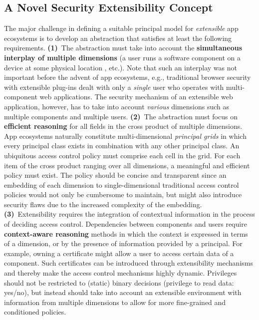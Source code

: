 \documentclass{src/acm_proc_article-sp} \else
\begin{document}
\subsection{A Novel Security Extensibility Concept}


The major challenge in defining a suitable principal model
for \emph{extensible} app ecosystems is to develop an
abstraction that satisfies at least the following
requirements.
\textbf{(1)}~The abstraction must take into account the
\textbf{simultaneous interplay of multiple dimensions} (a
user  runs a software component  on a device  at
some physical location , etc.). Note that such an interplay was not
important before the advent of app ecosystems, e.g.,
traditional browser security with extensible plug-ins dealt
with only a \emph{single} user who operates with multi-component
web applications. The security mechanism of an extensible
web application, however, has to take into account \emph{various}
dimensions such as multiple components and multiple users.
\textbf{(2)}~The abstraction must focus on \textbf{efficient
reasoning} for all fields in the cross product of multiple
dimensions. App ecosystems naturally constitute
multi-dimensional \emph{principal grids} in which every principal
class exists in combination with any other principal class.
An ubiquitous access control policy must comprise each cell
in the grid. For each item of the cross product ranging over
all dimensions, a meaningful and efficient policy must
exist. The policy should be concise and transparent since an
embedding of each dimension to single-dimensional
traditional access control policies would not only be
cumbersome to maintain, but might also introduce security
flaws due to the increased complexity of the embedding.
\textbf{(3)}~Extensibility requires the integration of
contextual information in the process of deciding access
control. Dependencies between components and users require
\textbf{context-aware reasoning} methods in which the
context is expressed in terms of a dimension, or by the
presence of information provided by a principal. For
example, owning a certificate might allow a user to access
certain data of a component. Such certificates can be
introduced through extensibility mechanisms and thereby make
the access control mechanisms highly dynamic. Privileges
should not be restricted to (static) binary decisions
(privilege to read data: yes/no), but instead should take
into account an extensible environment with information from
multiple dimensions to allow for more fine-grained and
conditioned policies.
\end{document}

